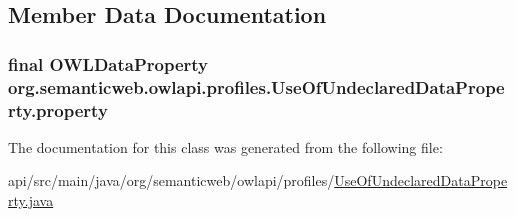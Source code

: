 \subsection{Member Data Documentation}
\hypertarget{classorg_1_1semanticweb_1_1owlapi_1_1profiles_1_1_use_of_undeclared_data_property_ab6de12c5f48047dcc7cc48723a21e708}{
\subsubsection[{property}]{\setlength{\rightskip}{0pt plus 5cm}final {\bf O\-W\-L\-Data\-Property} org.\-semanticweb.\-owlapi.\-profiles.\-Use\-Of\-Undeclared\-Data\-Property.\-property\hspace{0.3cm}{\ttfamily [private]}}}\label{classorg_1_1semanticweb_1_1owlapi_1_1profiles_1_1_use_of_undeclared_data_property_ab6de12c5f48047dcc7cc48723a21e708}


The documentation for this class was generated from the following file\-:\begin{DoxyCompactItemize}
\item 
api/src/main/java/org/semanticweb/owlapi/profiles/\hyperlink{_use_of_undeclared_data_property_8java}{Use\-Of\-Undeclared\-Data\-Property.\-java}\end{DoxyCompactItemize}
